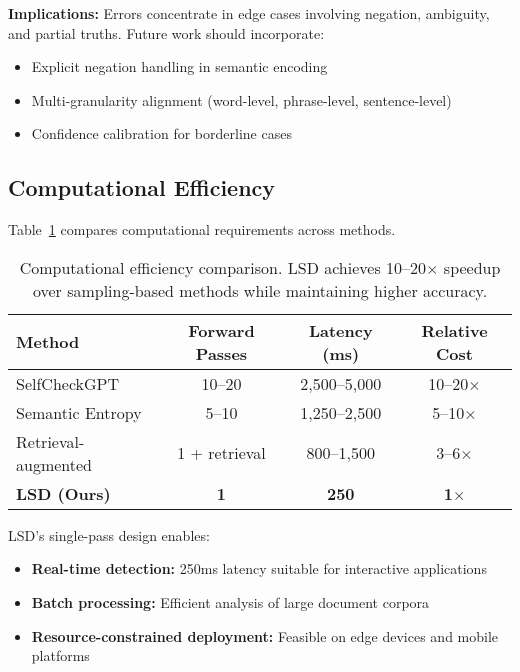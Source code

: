 \documentclass[11pt]{article}
\begin{document}
\textbf{Implications:} Errors concentrate in edge cases involving negation, ambiguity, and partial truths. Future work should incorporate:
\begin{itemize}[leftmargin=*]
    \item Explicit negation handling in semantic encoding
    \item Multi-granularity alignment (word-level, phrase-level, sentence-level)
    \item Confidence calibration for borderline cases
\end{itemize}

\subsection{Computational Efficiency}

Table~\ref{tab:efficiency} compares computational requirements across methods.

\begin{table}[h]
\centering
\begin{tabular}{lccc}
\toprule
\textbf{Method} & \textbf{Forward Passes} & \textbf{Latency (ms)} & \textbf{Relative Cost} \\
\midrule
SelfCheckGPT & 10--20 & 2,500--5,000 & 10--20$\times$ \\
Semantic Entropy & 5--10 & 1,250--2,500 & 5--10$\times$ \\
Retrieval-augmented & 1 + retrieval & 800--1,500 & 3--6$\times$ \\
\midrule
\textbf{LSD (Ours)} & \textbf{1} & \textbf{250} & \textbf{1$\times$} \\
\bottomrule
\end{tabular}
\caption{Computational efficiency comparison. LSD achieves 10--20$\times$ speedup over sampling-based methods while maintaining higher accuracy.}
\label{tab:efficiency}
\end{table}




LSD's single-pass design enables:
\begin{itemize}[leftmargin=*]
    \item \textbf{Real-time detection:} 250ms latency suitable for interactive applications
    \item \textbf{Batch processing:} Efficient analysis of large document corpora
    \item \textbf{Resource-constrained deployment:} Feasible on edge devices and mobile platforms
\end{itemize}
\end{document}
